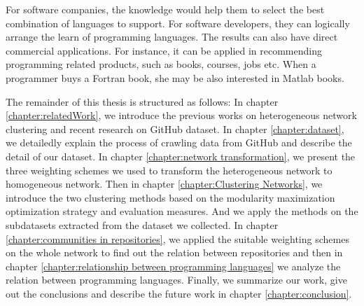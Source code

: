 \documentclass[12pt,oneside,final]{vlsithesis}
\begin{document}
For software companies, the knowledge would help them to select the best combination of languages to support. For software developers, they can logically arrange the learn of programming languages. The results can also have direct commercial applications. For instance, it can be applied in recommending programming related products, such as books, courses, jobs etc. When a programmer buys a Fortran book, she may be also interested in Matlab books. 

The remainder of this thesis is structured as follows: In chapter \ref{chapter:relatedWork}, we introduce the previous works on heterogeneous network clustering and recent research on GitHub dataset. In chapter \ref{chapter:dataset}, we detailedly explain the process of crawling data from GitHub and describe the detail of our dataset. In chapter \ref{chapter:network transformation}, we present the three weighting schemes we used to transform the heterogeneous network to homogeneous network. Then in chapter \ref{chapter:Clustering Networks}, we introduce the two clustering methods based on the modularity maximization optimization strategy and evaluation measures. And we apply the methods on the subdatasets extracted from the dataset we collected. In chapter \ref{chapter:communities in repositories}, we applied the suitable weighting schemes on the whole network to find out the relation between repositories and then in chapter \ref{chapter:relationship between programming languages} we analyze the relation between programming languages. Finally, we summarize our work, give out the conclusions and describe the future work in chapter \ref{chapter:conclusion}.
\end{document}
